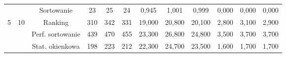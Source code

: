 \documentclass[magisterska]{pracamgr}
\begin{document}
\begin{table}[H]
{\begin{tabular}{@{}cccccccccccc@{}}
                                                               &                                                        & Sortowanie    & 23                                                     & 25                                                     & 24                                                        & 0,945                                                     & 1,001                                                      & 0,999                                                         & 0,000                                                              & 0,000                                                               & 0,000                                                                 \\
5                                                              & 10                                                     & Ranking    & 310                                                    & 342                                                    & 331                                                       & 19,000                                                    & 20,800                                                     & 20,100                                                        & 2,800                                                              & 3,100                                                               & 2,900                                                                 \\
                                                               &                                                        & Perf. sortowanie    & 439                                                    & 470                                                    & 455                                                       & 23,300                                                    & 26,800                                                     & 24,800                                                        & 3,500                                                              & 3,700                                                               & 3,700                                                                 \\
                                                               &                                                        & Stat. okienkowa    & 198                                                    & 223                                                    & 212                                                       & 22,300                                                    & 24,700                                                     & 23,500                                                        & 1,600                                                              & 1,700                                                               & 1,700                                                                 \\ \midrule

\end{tabular}}
\end{table}
\end{document}
